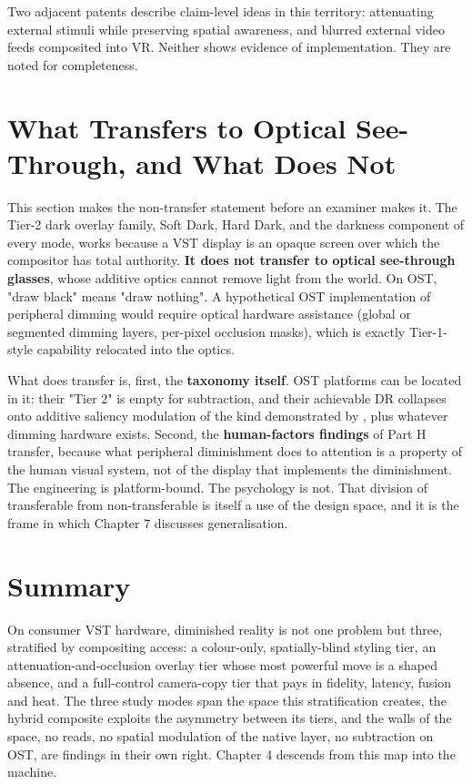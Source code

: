 Two adjacent patents \citep{patents} describe claim-level ideas in this territory:
attenuating external stimuli while preserving spatial awareness, and blurred external video feeds
composited into VR. Neither shows evidence of implementation. They are noted for
completeness.

\section{What Transfers to Optical See-Through, and What Does Not}

This section makes the non-transfer statement before an examiner makes it. The Tier-2 dark overlay
family, Soft Dark, Hard Dark, and the darkness component of every mode, works because a VST display
is an opaque screen over which the compositor has total authority. \textbf{It does not transfer to optical
see-through glasses}, whose additive optics cannot remove light from the world. On OST, "draw black"
means "draw nothing". A hypothetical OST implementation of peripheral dimming would require optical
hardware assistance (global or segmented dimming layers, per-pixel occlusion masks), which is exactly
Tier-1-style capability relocated into the optics.

What does transfer is, first, the \textbf{taxonomy itself}. OST platforms can be located in it: their
"Tier 2" is empty for subtraction, and their achievable DR collapses onto additive saliency modulation
of the kind demonstrated by \citet{sutton2022}, plus whatever dimming hardware exists. Second, the \textbf{human-factors
findings} of Part H transfer, because what peripheral diminishment does to attention is a property of
the human visual system, not of the display that implements the diminishment. The engineering is
platform-bound. The psychology is not. That division of transferable from non-transferable is itself
a use of the design space, and it is the frame in which Chapter 7 discusses generalisation.

\section{Summary}

On consumer VST hardware, diminished reality is not one problem but three, stratified by compositing
access: a colour-only, spatially-blind styling tier, an attenuation-and-occlusion overlay tier whose
most powerful move is a shaped absence, and a full-control camera-copy tier that pays in fidelity,
latency, fusion and heat. The three study modes span the space this stratification creates, the
hybrid composite exploits the asymmetry between its tiers, and the walls of the space, no reads, no
spatial modulation of the native layer, no subtraction on OST, are findings in their own right.
Chapter 4 descends from this map into the machine.
